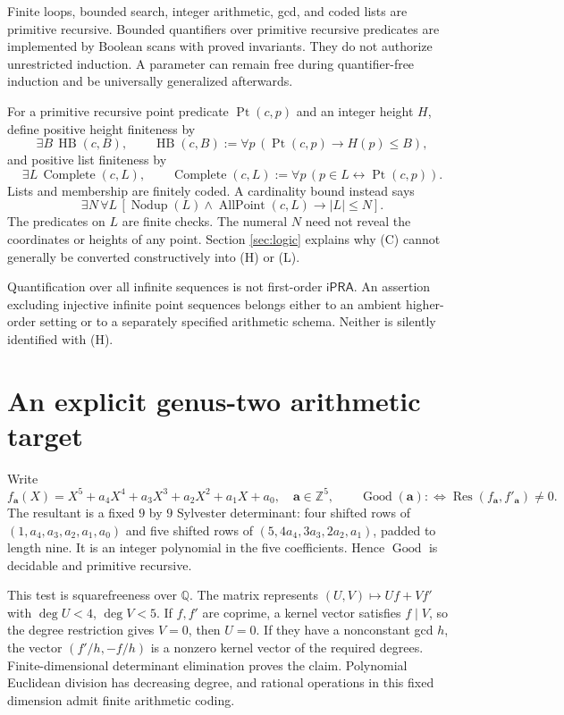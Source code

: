 \documentclass[11pt,letterpaper]{article}
\newcommand{\iPRA}{\mathsf{iPRA}}
\newcommand{\Z}{\mathbb Z}
\newcommand{\Q}{\mathbb Q}
\newcommand{\Good}{\operatorname{Good}}
\newcommand{\Pt}{\operatorname{Pt}}
\newcommand{\HB}{\operatorname{HB}}
\newcommand{\Comp}{\operatorname{Complete}}
\theoremstyle{definition}
\begin{document}
Finite loops, bounded search, integer arithmetic, gcd, and coded lists
are primitive recursive. Bounded quantifiers over primitive recursive predicates
are implemented by Boolean scans with proved invariants. They do not
authorize unrestricted induction. A parameter can remain free during
quantifier-free induction and be universally generalized afterwards.

For a primitive recursive point predicate $\Pt(c,p)$ and an integer
height $H$, define positive height finiteness by
\[
 \exists B\,\HB(c,B),\qquad
 \HB(c,B):=\forall p\,(\Pt(c,p)\to H(p)\leq B),              \tag{H}
\]
and positive list finiteness by
\[
 \exists L\,\Comp(c,L),\qquad
 \Comp(c,L):=\forall p\,(p\in L\leftrightarrow\Pt(c,p)).     \tag{L}
\]
Lists and membership are finitely coded. A cardinality bound instead says
\[
 \exists N\,\forall L\,
 [\operatorname{Nodup}(L)\wedge\operatorname{AllPoint}(c,L)
   \to |L|\leq N].                                      \tag{C}
\]
The predicates on $L$ are finite checks. The numeral $N$ need not reveal
the coordinates or heights of any point. Section \ref{sec:logic} explains
why (C) cannot generally be converted constructively into (H) or (L).

Quantification over all infinite sequences is not first-order $\iPRA$.
An assertion excluding injective infinite point sequences belongs either
to an ambient higher-order setting or to a separately specified arithmetic
schema. Neither is silently identified with (H).

\section{An explicit genus-two arithmetic target}
\label{sec:quintic}
Write
\[
 f_{\mathbf a}(X)=X^5+a_4X^4+a_3X^3+a_2X^2+a_1X+a_0,
 \quad \mathbf a\in\Z^5,\qquad
 \Good(\mathbf a):\Longleftrightarrow
 \operatorname{Res}(f_{\mathbf a},f'_{\mathbf a})\ne0.      \tag{1}
\]
The resultant is a fixed $9$ by $9$ Sylvester determinant: four shifted
rows of $(1,a_4,a_3,a_2,a_1,a_0)$ and five shifted rows of
$(5,4a_4,3a_3,2a_2,a_1)$, padded to length nine. It is an integer
polynomial in the five coefficients. Hence $\Good$ is decidable
and primitive recursive.

This test is squarefreeness over $\Q$. The matrix represents
$(U,V)\mapsto Uf+Vf'$ with $\deg U<4$, $\deg V<5$.
If $f,f'$ are coprime, a kernel vector satisfies $f\mid V$, so the
degree restriction gives $V=0$, then $U=0$.
If they have a nonconstant gcd $h$, the vector $(f'/h,-f/h)$ is a
nonzero kernel vector of the required degrees. Finite-dimensional
determinant elimination proves the claim. Polynomial Euclidean division
has decreasing degree, and rational operations in this fixed dimension
admit finite arithmetic coding.
\end{document}
